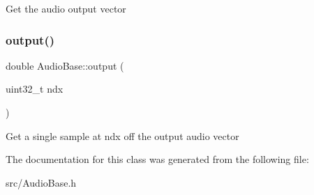 Get the audio output vector \mbox{\label{class_audio_base_a51df052f8e916fff79df78558c0193b4}} 
\subsubsection{\texorpdfstring{output()}{output()}\hspace{0.1cm}{\footnotesize\ttfamily [2/2]}}
{\footnotesize\ttfamily double Audio\+Base\+::output (\begin{DoxyParamCaption}\item[{uint32\+\_\+t}]{ndx }\end{DoxyParamCaption})\hspace{0.3cm}{\ttfamily [inline]}}

Get a single sample at ndx off the output audio vector 

The documentation for this class was generated from the following file\+:\begin{DoxyCompactItemize}
\item 
src/Audio\+Base.\+h\end{DoxyCompactItemize}
